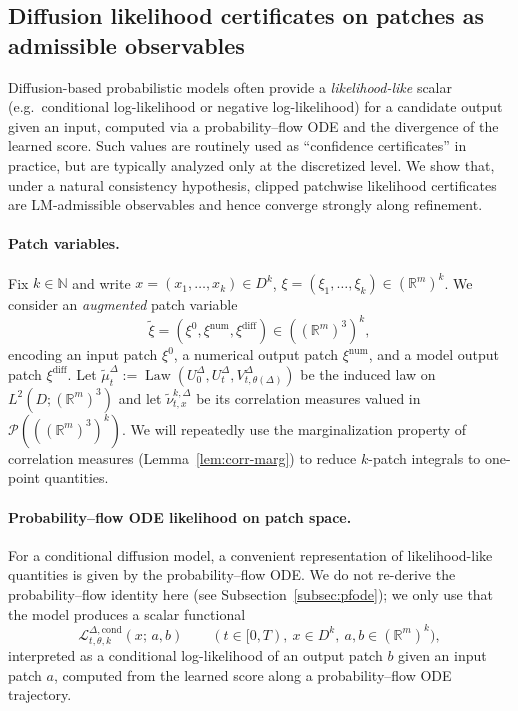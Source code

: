 \documentclass{article}
\numberwithin{equation}{section}
\theoremstyle{plain}
\theoremstyle{definition}
\theoremstyle{remark}
\newcommand{\N}{\mathbb{N}}
\newcommand{\R}{\mathbb{R}}
\newcommand{\Pcal}{\mathcal{P}}
\DeclareMathOperator{\Law}{Law}
\begin{document}
\subsection{Diffusion likelihood certificates on patches as admissible observables}
\label{subsec:app-likelihood}

Diffusion-based probabilistic models often provide a \emph{likelihood-like} scalar (e.g.\ conditional log-likelihood or
negative log-likelihood) for a candidate output given an input, computed via a probability--flow ODE and the divergence of
the learned score. Such values are routinely used as ``confidence certificates'' in practice, but are typically analyzed
only at the discretized level. We show that, under a natural consistency hypothesis, clipped patchwise likelihood
certificates are LM-admissible observables and hence converge strongly along refinement.

\paragraph{Patch variables.}
Fix $k\in\N$ and write $x=(x_1,\dots,x_k)\in D^k$, $\xi=(\xi_1,\dots,\xi_k)\in(\R^m)^k$.
We consider an \emph{augmented} patch variable
\[
\widetilde\xi=(\xi^0,\xi^{\mathrm{num}},\xi^{\mathrm{diff}})\in ((\R^m)^3)^k,
\]
encoding an input patch $\xi^0$, a numerical output patch $\xi^{\mathrm{num}}$, and a model output patch
$\xi^{\mathrm{diff}}$.
Let $\widetilde\mu^\Delta_t:=\Law(U_0^\Delta,U_t^\Delta,V^\Delta_{t,\theta(\Delta)})$ be the induced law on
$L^2(D;(\R^m)^3)$ and let $\widetilde\nu^{k,\Delta}_{t,x}$ be its correlation measures valued in $\Pcal(((\R^m)^3)^k)$. We will repeatedly use the marginalization property of correlation measures (Lemma~\ref{lem:corr-marg})
to reduce $k$-patch integrals to one-point quantities.


\paragraph{Probability--flow ODE likelihood on patch space.}
For a conditional diffusion model, a convenient representation of likelihood-like quantities is given by the probability--flow
ODE. We do not re-derive the probability--flow identity here (see Subsection~\ref{subsec:pfode}); we only use that the model
produces a scalar functional
\[
\mathcal L^{\Delta,\mathrm{cond}}_{t,\theta,k}(x;\,a,b)
\qquad (t\in[0,T),\ x\in D^k,\ a,b\in(\R^m)^k),
\]
interpreted as a conditional log-likelihood of an output patch $b$ given an input patch $a$, computed from the learned score
along a probability--flow ODE trajectory.
\end{document}
